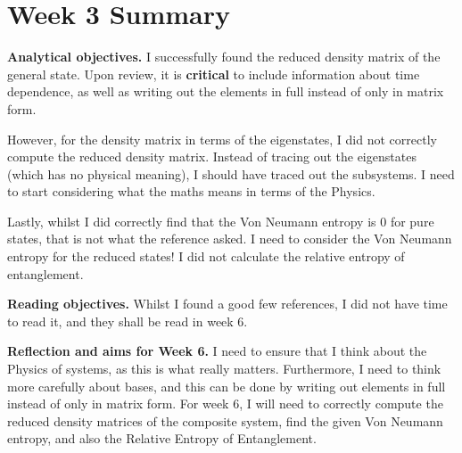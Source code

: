 \documentclass{article}
\begin{document}
\section*{Week 3 Summary}

\vspace{0.5cm}

\textbf{Analytical objectives.} I successfully found the reduced density matrix of the general state. Upon review, it is \textbf{critical} to include information about time dependence, as well as writing out the elements in full instead of only in matrix form. 

However, for the density matrix in terms of the eigenstates, I did not correctly compute the reduced density matrix. Instead of tracing out the eigenstates (which has no physical meaning), I should have traced out the subsystems. I need to start considering what the maths means in terms of the Physics. 

Lastly, whilst I did correctly find that the Von Neumann entropy is 0 for pure states, that is not what the reference asked. I need to consider the Von Neumann entropy for the reduced states! I did not calculate the relative entropy of entanglement.

\vspace{0.5cm}

\textbf{Reading objectives.} Whilst I found a good few references, I did not have time to read it, and they shall be read in week 6. 

\vspace{0.5cm}

\textbf{Reflection and aims for Week 6.} I need to ensure that I think about the Physics of systems, as this is what really matters. Furthermore, I need to think more carefully about bases, and this can be done by writing out elements in full instead of only in matrix form. 
For week 6, I will need to correctly compute the reduced density matrices of the composite system, find the given Von Neumann entropy, and also the Relative Entropy of Entanglement. 
\end{document}
